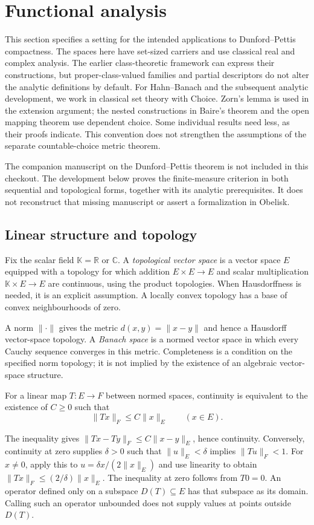 \def\topic{Functional analysis}

\section{Functional analysis}
\label{sec:functional_analysis}
This section specifies a setting for the intended applications to
Dunford--Pettis compactness. The spaces here have set-sized carriers and
use classical real and complex analysis. The earlier class-theoretic framework can
express their constructions, but proper-class-valued families and
partial descriptors do not alter the analytic definitions by default.
For Hahn--Banach and the subsequent analytic development, we work in
classical set theory with Choice. Zorn's lemma is used in the extension
argument; the nested constructions in Baire's theorem and the open
mapping theorem use dependent choice. Some individual results need
less, as their proofs indicate. This convention does not strengthen
the assumptions of the separate countable-choice metric theorem.

The companion manuscript on the Dunford--Pettis theorem is not included
in this checkout. The development below proves the finite-measure criterion
in both sequential and topological forms, together with its analytic
prerequisites. It does not
reconstruct that missing manuscript or assert a formalization in Obelisk.

\subsection{Linear structure and topology}
Fix the scalar field $\mathbb{K}=\mathbb{R}$ or $\mathbb{C}$. A
\emph{topological vector space} is a vector space $E$ equipped with a
topology for which addition $E\times E\to E$ and scalar multiplication
$\mathbb{K}\times E\to E$ are continuous, using the product topologies.
When Hausdorffness is needed, it is an explicit assumption. A locally
convex topology has a base of convex neighbourhoods of zero.

A norm $\|\cdot\|$ gives the metric $d(x,y)=\|x-y\|$ and hence a
Hausdorff vector-space topology. A \emph{Banach space} is a normed
vector space in which every Cauchy sequence converges in this metric.
Completeness is a condition on the specified norm topology; it is not
implied by the existence of an algebraic vector-space structure.

\begin{lemma}
For a linear map $T:E\to F$ between normed spaces, continuity is
equivalent to the existence of $C\geqslant0$ such that
\[
\|Tx\|_F\leqslant C\|x\|_E\qquad(x\in E).
\]
\end{lemma}
\Proof
The inequality gives
$\|Tx-Ty\|_F\leqslant C\|x-y\|_E$, hence continuity.
Conversely, continuity at zero supplies $\delta>0$ such that
$\|u\|_E<\delta$ implies $\|Tu\|_F<1$. For $x\ne0$, apply this to
$u=\delta x/(2\|x\|_E)$ and use linearity to obtain
$\|Tx\|_F\leqslant(2/\delta)\|x\|_E$. The inequality at zero follows
from $T0=0$.
\Done
An operator defined only on a subspace $D(T)\subseteq E$ has that
subspace as its domain. Calling such an operator unbounded does not
supply values at points outside $D(T)$.

